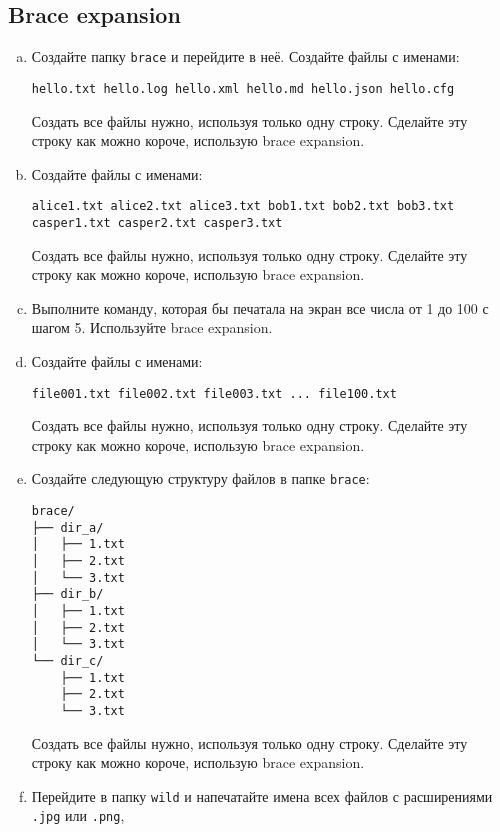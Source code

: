 \documentclass{article}
\begin{document}
\subsection{Brace expansion}
\begin{enumerate}[a.]
\item Создайте папку \texttt{brace} и перейдите в неё. Создайте файлы с именами:
\begin{verbatim}
hello.txt hello.log hello.xml hello.md hello.json hello.cfg
\end{verbatim}
Создать все файлы нужно, используя только одну строку. Сделайте эту строку как можно короче, использую brace expansion.

\item Создайте файлы с именами:
\begin{verbatim}
alice1.txt alice2.txt alice3.txt bob1.txt bob2.txt bob3.txt casper1.txt casper2.txt casper3.txt
\end{verbatim}
Создать все файлы нужно, используя только одну строку. Сделайте эту строку как можно короче, использую brace expansion.

\item Выполните команду, которая бы печатала на экран все числа от 1 до 100 с шагом 5. Используйте brace expansion.

\item Создайте файлы с именами:
\begin{verbatim}
file001.txt file002.txt file003.txt ... file100.txt
\end{verbatim}
Создать все файлы нужно, используя только одну строку. Сделайте эту строку как можно короче, использую brace expansion.

\item Создайте следующую структуру файлов в папке \texttt{brace}:
\begin{center}
\begin{BVerbatim}
brace/
├── dir_a/
│   ├── 1.txt
│   ├── 2.txt
│   └── 3.txt
├── dir_b/
│   ├── 1.txt
│   ├── 2.txt
│   └── 3.txt
└── dir_c/
    ├── 1.txt
    ├── 2.txt
    └── 3.txt
\end{BVerbatim}
\end{center}
Создать все файлы нужно, используя только одну строку. Сделайте эту строку как можно короче, использую brace expansion.

\item Перейдите в папку \texttt{wild} и напечатайте имена всех файлов с расширениями \texttt{.jpg} или \texttt{.png}, 
\end{enumerate}
\end{document}
